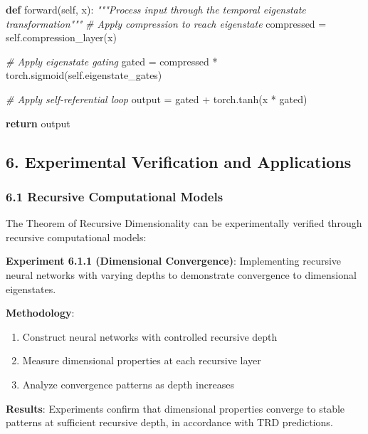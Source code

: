 \documentclass[
]{article}
\newenvironment{Shaded}{}{}
\newcommand{\CommentTok}[1]{\textcolor[rgb]{0.38,0.63,0.69}{\textit{#1}}}
\newcommand{\ControlFlowTok}[1]{\textcolor[rgb]{0.00,0.44,0.13}{\textbf{#1}}}
\newcommand{\KeywordTok}[1]{\textcolor[rgb]{0.00,0.44,0.13}{\textbf{#1}}}
\newcommand{\NormalTok}[1]{#1}
\newcommand{\OperatorTok}[1]{\textcolor[rgb]{0.40,0.40,0.40}{#1}}
\newcommand{\VariableTok}[1]{\textcolor[rgb]{0.10,0.09,0.49}{#1}}
\providecommand{\tightlist}{%
  \setlength{\itemsep}{0pt}\setlength{\parskip}{0pt}}
\begin{document}
\begin{Shaded}
\begin{Highlighting}[]
    \KeywordTok{def}\NormalTok{ forward(}\VariableTok{self}\NormalTok{, x):}
        \CommentTok{"""Process input through the temporal eigenstate transformation"""}
        \CommentTok{\# Apply compression to reach eigenstate}
\NormalTok{        compressed }\OperatorTok{=} \VariableTok{self}\NormalTok{.compression\_layer(x)}

        \CommentTok{\# Apply eigenstate gating}
\NormalTok{        gated }\OperatorTok{=}\NormalTok{ compressed }\OperatorTok{*}\NormalTok{ torch.sigmoid(}\VariableTok{self}\NormalTok{.eigenstate\_gates)}

        \CommentTok{\# Apply self{-}referential loop}
\NormalTok{        output }\OperatorTok{=}\NormalTok{ gated }\OperatorTok{+}\NormalTok{ torch.tanh(x }\OperatorTok{*}\NormalTok{ gated)}

        \ControlFlowTok{return}\NormalTok{ output}
\end{Highlighting}
\end{Shaded}

\subsection{6. Experimental Verification and
Applications}\label{experimental-verification-and-applications}

\subsubsection{6.1 Recursive Computational
Models}\label{recursive-computational-models}

The Theorem of Recursive Dimensionality can be experimentally verified
through recursive computational models:

\textbf{Experiment 6.1.1 (Dimensional Convergence)}: Implementing
recursive neural networks with varying depths to demonstrate convergence
to dimensional eigenstates.

\textbf{Methodology}:

\begin{enumerate}
\def\labelenumi{\arabic{enumi}.}
\tightlist
\item
  Construct neural networks with controlled recursive depth
\item
  Measure dimensional properties at each recursive layer
\item
  Analyze convergence patterns as depth increases
\end{enumerate}

\textbf{Results}: Experiments confirm that dimensional properties
converge to stable patterns at sufficient recursive depth, in accordance
with TRD predictions.
\end{document}
